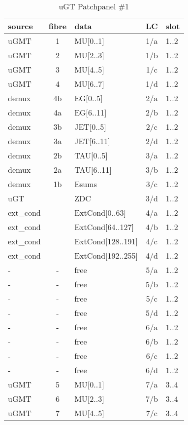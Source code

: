 \begin{longtable}{|l|c|l|c|l|}
\caption{uGT Patchpanel \#1}
    \label{tab:app:ugt_opt_pp_1}\\
\hline
\textbf{source}& \textbf{fibre}& \textbf{data}& \textbf{LC}& \textbf{slot}\\
\hline
\hline
\endhead
uGMT  & 1   & MU[0..1]   & 1/a  & 1..2 \\\hline
uGMT  & 2   & MU[2..3]   & 1/b  & 1..2 \\\hline
uGMT  & 3   & MU[4..5]   & 1/c  & 1..2 \\\hline
uGMT  & 4   & MU[6..7]   & 1/d  & 1..2 \\\hline
demux & 4b  & EG[0..5]   & 2/a  & 1..2 \\\hline
demux & 4a  & EG[6..11]  & 2/b  & 1..2 \\\hline
demux & 3b  & JET[0..5]  & 2/c  & 1..2 \\\hline
demux & 3a  & JET[6..11] & 2/d  & 1..2 \\\hline
demux & 2b  & TAU[0..5]  & 3/a  & 1..2 \\\hline
demux & 2a  & TAU[6..11] & 3/b  & 1..2 \\\hline
demux & 1b  & Esums      & 3/c  & 1..2 \\\hline
uGT &    & ZDC      & 3/d  & 1..2 \\\hline
ext\_cond &     & ExtCond[0..63]    & 4/a  & 1..2 \\\hline
ext\_cond &     & ExtCond[64..127]  & 4/b  & 1..2 \\\hline
ext\_cond &     & ExtCond[128..191] & 4/c  & 1..2 \\\hline
ext\_cond &     & ExtCond[192..255] & 4/d  & 1..2 \\\hline
- & - & free & 5/a  & 1..2 \\\hline
- & - & free & 5/b  & 1..2 \\\hline
- & - & free & 5/c  & 1..2 \\\hline
- & - & free & 5/d  & 1..2 \\\hline
- & - & free & 6/a  & 1..2 \\\hline
- & - & free & 6/b  & 1..2 \\\hline
- & - & free & 6/c  & 1..2 \\\hline
- & - & free & 6/d  & 1..2 \\\hline
\hline
uGMT  & 5   & MU[0..1]   & 7/a  & 3..4 \\\hline
uGMT  & 6   & MU[2..3]   & 7/b  & 3..4 \\\hline
uGMT  & 7   & MU[4..5]   & 7/c  & 3..4 \\\hline

\end{longtable}
